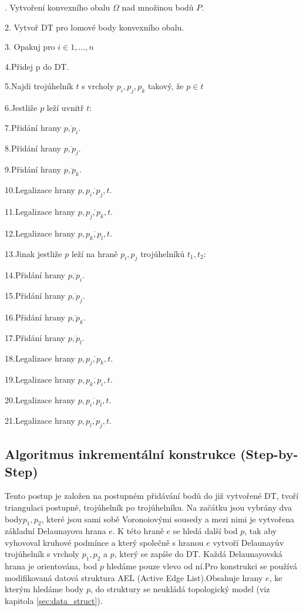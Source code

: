 \documentclass[12pt,a4paper]{article}
\begin{document}
.  Vytvoření konvexního obalu $\Omega$ nad množinou bodů $P$.

2.  Vytvoř DT pro lomové body konvexního obalu.

3.  Opakuj pro $i \in 1,...,n$

4.\indent  Přidej p do DT.

5.\indent  Najdi trojúhelník $t$ s vrcholy $p_i, p_j, p_k$ takový, že $p \in t$

6.\indent  Jestliže $p$ leží uvnitř $t$:

7.\indent \indent Přidání hrany $\overline{p,p_i}$.

8.\indent \indent Přidání hrany $\overline{p,p_j}$.

9.\indent \indent Přidání hrany $\overline{p,p_k}$.

10.\indent \indent Legalizace hrany $p,\overline{p_i,p_j},t$.

11.\indent \indent Legalizace hrany $p,\overline{p_j,p_k},t$.

12.\indent \indent Legalizace hrany $p,\overline{p_k,p_l},t$.

13.\indent Jinak jestliže $p$ leží na hraně $p_i, p_j$ trojúhelníků $t_1, t_2$:

14.\indent \indent Přidání hrany $\overline{p,p_i}$.

15.\indent \indent Přidání hrany $\overline{p,p_j}$.

16.\indent \indent Přidání hrany $\overline{p,p_k}$.

17.\indent \indent Přidání hrany $\overline{p,p_l}$.

18.\indent \indent Legalizace hrany $p,\overline{p_j,p_k},t$.

19.\indent \indent Legalizace hrany $p,\overline{p_k,p_i},t$.

20.\indent \indent Legalizace hrany $p,\overline{p_i,p_l},t$.

21.\indent \indent Legalizace hrany $p,\overline{p_l,p_j},t$.

\newpage
\subsection{Algoritmus inkrementální konstrukce (Step-by-Step)}

Tento postup je založen na postupném přidávání bodů do již vytvořené DT, tvoří triangulaci postupně, trojúhelník po trojúhelníku. Na začátku jsou vybrány dva body$p_1, p_2$, které jsou sami sobě Voronoiovými sousedy a mezi nimi je vytvořena základní Delaunayova hrana $e$. K této hraně $e$ se hledá další bod 	$p$, tak aby vyhovoval kruhové podmínce a který společně s hranou $e$ vytvoří Delaunayův trojúhelník s vrcholy $p_1, p_2$ a $p$, který se zapíše do DT. Každá Delaunayovská hrana je orientována, bod $p$ hledáme pouze vlevo od ní.Pro konstrukci se používá modifikovaná datová struktura AEL (Active Edge List).Obsahuje hrany $e$, ke kterým hledáme body $p$, do struktury se neukládá topologický model (viz kapitola \ref{sec:data_struct}).
\end{document}
